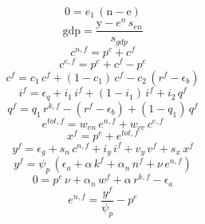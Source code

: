 \begin{dmath}
0={{e_{1}}}\, \left({{\mathrm{n}}}-{{\mathrm{e}}}\right)
\end{dmath}
\begin{dmath}
{{\mathrm{gdp}}}=\frac{{{\mathrm{y}}}-{{e^{n}}}\, {{s_{en}}}}{{{s_{gdp}}}}
\end{dmath}
\begin{dmath}
{{c^{n,f}}}={{p^{c}}}+{{c^{f}}}
\end{dmath}
\begin{dmath}
{{c^{e,f}}}={{p^{c}}}+{{c^{f}}}-{{p^{e}}}
\end{dmath}
\begin{dmath}
{{c^{f}}}={{c_{1}}}\, {{c^{f}}}+\left(1-{{c_{1}}}\right)\, {{c^{f}}}-{{c_{2}}}\, \left({{r^{f}}}-{{\epsilon_{b}}}\right)
\end{dmath}
\begin{dmath}
{{i^{f}}}={{\epsilon_{q}}}+{{i_{1}}}\, {{i^{f}}}+\left(1-{{i_{1}}}\right)\, {{i^{f}}}+{{i_{2}}}\, {{q^{f}}}
\end{dmath}
\begin{dmath}
{{q^{f}}}={{q_{1}}}\, {{r^{k,f}}}-\left({{r^{f}}}-{{\epsilon_{b}}}\right)+\left(1-{{q_{1}}}\right)\, {{q^{f}}}
\end{dmath}
\begin{dmath}
{{e^{tot,f}}}={{w_{en}}}\, {{e^{n,f}}}+{{w_{ce}}}\, {{c^{e,f}}}
\end{dmath}
\begin{dmath}
{{x^{f}}}={{p^{e}}}+{{e^{tot,f}}}
\end{dmath}
\begin{dmath}
{{y^{f}}}={{\epsilon_{g}}}+{{s_{n}}}\, {{c^{n,f}}}+{{i_{y}}}\, {{i^{f}}}+{{v_{y}}}\, {{v^{f}}}+{{s_{x}}}\, {{x^{f}}}
\end{dmath}
\begin{dmath}
{{y^{f}}}={{\psi_{p}}}\, \left({{\epsilon_{a}}}+{{\alpha}}\, {{k^{f}}}+{{\alpha_{n}}}\, {{n^{f}}}+{{\nu}}\, {{e^{n,f}}}\right)
\end{dmath}
\begin{dmath}
0={{p^{e}}}\, {{\nu}}+{{\alpha_{n}}}\, {{w^{f}}}+{{\alpha}}\, {{r^{k,f}}}-{{\epsilon_{a}}}
\end{dmath}
\begin{dmath}
{{e^{n,f}}}=\frac{{{y^{f}}}}{{{\psi_{p}}}}-{{p^{e}}}
\end{dmath}
